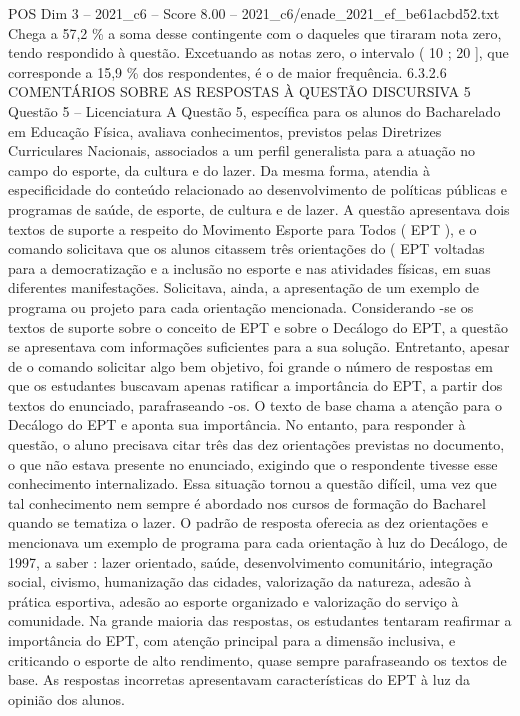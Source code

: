 \begin{textsample}{POS Dim 3 – 2021\_c6 – Score 8.00 – 2021\_c6/enade\_2021\_ef\_be61acbd52.txt}
Chega a 57,2 \% a soma desse contingente com o daqueles que tiraram nota zero, tendo respondido à questão.
Excetuando as notas zero, o intervalo ( 10 ; 20 ], que corresponde a 15,9 \% dos respondentes, é o de maior frequência. 6.3.2.6 COMENTÁRIOS SOBRE AS RESPOSTAS À QUESTÃO DISCURSIVA 5 Questão 5 – Licenciatura A Questão 5, específica para os alunos do Bacharelado em Educação Física, avaliava conhecimentos, previstos pelas Diretrizes Curriculares Nacionais, associados a um perfil generalista para a atuação no campo do esporte, da cultura e do lazer.
Da mesma forma, atendia à especificidade do conteúdo relacionado ao desenvolvimento de políticas públicas e programas de saúde, de esporte, de cultura e de lazer.
A questão apresentava dois textos de suporte a respeito do Movimento Esporte para Todos ( EPT ), e o comando solicitava que os alunos citassem três orientações do ( EPT voltadas para a democratização e a inclusão no esporte e nas atividades físicas, em suas diferentes manifestações.
Solicitava, ainda, a apresentação de um exemplo de programa ou projeto para cada orientação mencionada.
Considerando -se os textos de suporte sobre o conceito de EPT e sobre o Decálogo do EPT, a questão se apresentava com informações suficientes para a sua solução.
Entretanto, apesar de o comando solicitar algo bem objetivo, foi grande o número de respostas em que os estudantes buscavam apenas ratificar a importância do EPT, a partir dos textos do enunciado, parafraseando -os.
O texto de base chama a atenção para o Decálogo do EPT e aponta sua importância.
No entanto, para responder à questão, o aluno precisava citar três das dez orientações previstas no documento, o que não estava presente no enunciado, exigindo que o respondente tivesse esse conhecimento internalizado.
Essa situação tornou a questão difícil, uma vez que tal conhecimento nem sempre é abordado nos cursos de formação do Bacharel quando se tematiza o lazer.
O padrão de resposta oferecia as dez orientações e mencionava um exemplo de programa para cada orientação à luz do Decálogo, de 1997, a saber : lazer orientado, saúde, desenvolvimento comunitário, integração social, civismo, humanização das cidades, valorização da natureza, adesão à prática esportiva, adesão ao esporte organizado e valorização do serviço à comunidade.
Na grande maioria das respostas, os estudantes tentaram reafirmar a importância do EPT, com atenção principal para a dimensão inclusiva, e criticando o esporte de alto rendimento, quase sempre parafraseando os textos de base.
As respostas incorretas apresentavam características do EPT à luz da opinião dos alunos.

\end{textsample}
